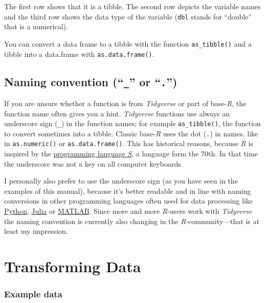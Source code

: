 \documentclass[
]{scrartcl}
\makeatletter
\newenvironment{kframe}{%
\medskip{}
\setlength{\fboxsep}{.8em}
 \def\at@end@of@kframe{}%
 \ifinner\ifhmode%
  \def\at@end@of@kframe{\end{minipage}}%
  \begin{minipage}{\columnwidth}%
 \fi\fi%
 \def\FrameCommand##1{\hskip\@totalleftmargin \hskip-\fboxsep
 \colorbox{shadecolor}{##1}\hskip-\fboxsep
     \hskip-\linewidth \hskip-\@totalleftmargin \hskip\columnwidth}%
 \MakeFramed {\advance\hsize-\width
   \@totalleftmargin\z@ \linewidth\hsize
   \@setminipage}}%
 {\par\unskip\endMakeFramed%
 \at@end@of@kframe}
\newenvironment{rmdblock}[1]
  {
  \begin{itemize}
  \renewcommand{\labelitemi}{
    \raisebox{-.7\height}[0pt][0pt]{
      {\setkeys{Gin}{width=3em,keepaspectratio}\texttt{[image: images/\#1]}}
    }
  }
  \setlength{\fboxsep}{1em}
  \begin{kframe}
  \item
  }
  {
  \end{kframe}
  \end{itemize}
  }
\newenvironment{geek}
    {\begin{rmdblock}{geek}}
    {\end{rmdblock}}
\makeatother
\begin{document}
The first row shows that it is a tibble. The second row depicts the variable names and the third row shows the data type of the variable (\texttt{dbl} stands for ``double'' that is a numerical).

\begin{geek}
You can convert a data frame to a tibble with the function
\texttt{as\_tibble()} and a tibble into a data.frame with
\texttt{as.data.frame()}.
\end{geek}

\hypertarget{naming-convention-_-or-.}{%
\subsection{\texorpdfstring{Naming convention (``\texttt{\_}'' or ``\texttt{.}'')}{Naming convention (``\_'' or ``.'')}}\label{naming-convention-_-or-.}}

If you are unsure whether a function is from \emph{Tidyverse} or part of base-\emph{R}, the function name often gives you a hint. \emph{Tidyverse} functions use always an underscore sign (\texttt{\_}) in the function names; for example \texttt{as\_tibble()}, the function to convert sometimes into a tibble. Classic base-\emph{R} uses the dot (\texttt{.}) in names, like in \texttt{as.numeric()} or \texttt{as.data.frame()}. This has historical reasons, because \emph{R} is inspired by the \href{https://en.wikipedia.org/wiki/S_(programming_language)}{programming language \emph{S}}, a language form the 70th. In that time the underscore was not a key on all computer keyboards.

I personally also prefer to use the underscore sign (as you have seen in the examples of this manual), because it's better readable and in line with naming conversions in other programming languages often used for data processing like \href{https://www.python.org/}{Python}, \href{https://julialang.org/}{Julia} or \href{https://en.wikipedia.org/wiki/MATLAB}{MATLAB}. Since more and more \emph{R}-users work with \emph{Tidyverse} the naming convention is currently also changing in the \emph{R}-community---that is at least my impression.

\hypertarget{transformingdata}{%
\section{Transforming Data}\label{transformingdata}}

\hypertarget{example-data}{%
\subsubsection*{Example data}\label{example-data}}
\end{document}
